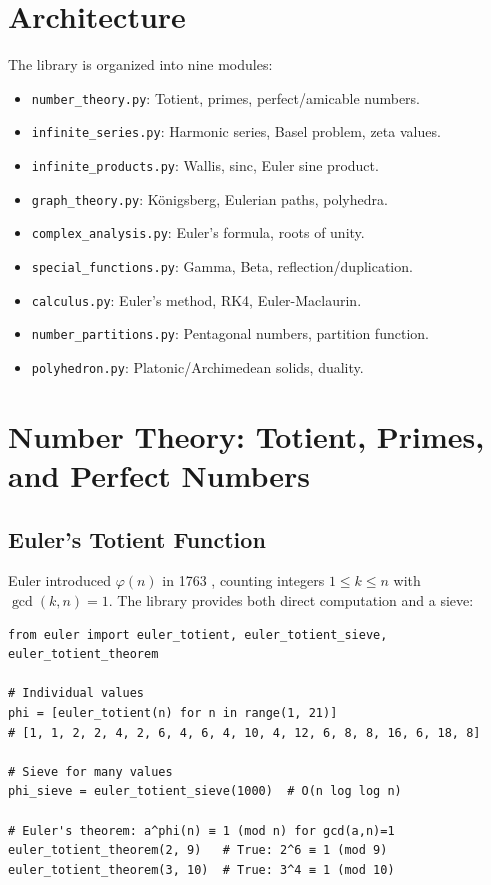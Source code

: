 \documentclass[11pt,a4paper]{article}
\theoremstyle{definition}
\begin{document}
\section{Architecture}
The library is organized into nine modules:
\begin{itemize}
    \item \texttt{number\_theory.py}: Totient, primes, perfect/amicable numbers.
    \item \texttt{infinite\_series.py}: Harmonic series, Basel problem, zeta values.
    \item \texttt{infinite\_products.py}: Wallis, sinc, Euler sine product.
    \item \texttt{graph\_theory.py}: K\"onigsberg, Eulerian paths, polyhedra.
    \item \texttt{complex\_analysis.py}: Euler's formula, roots of unity.
    \item \texttt{special\_functions.py}: Gamma, Beta, reflection/duplication.
    \item \texttt{calculus.py}: Euler's method, RK4, Euler-Maclaurin.
    \item \texttt{number\_partitions.py}: Pentagonal numbers, partition function.
    \item \texttt{polyhedron.py}: Platonic/Archimedean solids, duality.
\end{itemize}

\section{Number Theory: Totient, Primes, and Perfect Numbers}
\label{sec:number_theory}

\subsection{Euler's Totient Function}
Euler introduced $\varphi(n)$ in 1763 \cite{euler1763}, counting integers $1 \le k \le n$ with $\gcd(k,n)=1$. The library provides both direct computation and a sieve:

\begin{lstlisting}[caption={Euler's totient function}, label=lst:totient]
from euler import euler_totient, euler_totient_sieve, euler_totient_theorem

# Individual values
phi = [euler_totient(n) for n in range(1, 21)]
# [1, 1, 2, 2, 4, 2, 6, 4, 6, 4, 10, 4, 12, 6, 8, 8, 16, 6, 18, 8]

# Sieve for many values
phi_sieve = euler_totient_sieve(1000)  # O(n log log n)

# Euler's theorem: a^phi(n) ≡ 1 (mod n) for gcd(a,n)=1
euler_totient_theorem(2, 9)   # True: 2^6 ≡ 1 (mod 9)
euler_totient_theorem(3, 10)  # True: 3^4 ≡ 1 (mod 10)
\end{lstlisting}
\end{document}
